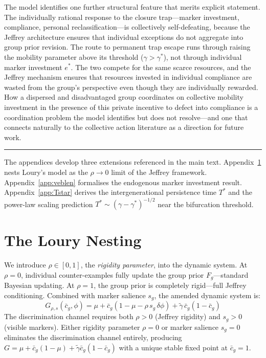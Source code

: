 \documentclass[12pt,a4paper]{article}
\theoremstyle{definition}
\numberwithin{proposition}{subsection}
\begin{document}
The model identifies one further structural feature that merits
explicit statement. The individually rational response to the
closure trap---marker investment, compliance, personal
reclassification---is collectively self-defeating, because the
Jeffrey architecture ensures that individual exceptions do not
aggregate into group prior revision. The route to permanent trap
escape runs through raising the mobility parameter above its
threshold ($\gamma > \gamma^*$), not through individual marker
investment $e^*$. The
two compete for the same scarce resources, and the Jeffrey
mechanism ensures that resources invested in individual compliance
are wasted from the group's perspective even though they are
individually rewarded. How a dispersed and disadvantaged group
coordinates on collective mobility investment in the presence of
this private incentive to defect into compliance is a coordination
problem the model identifies but does not resolve---and one that
connects naturally to the collective action literature as a
direction for future work.

\bigskip
\noindent\rule{\textwidth}{0.4pt}
\medskip

\noindent The appendices develop three extensions referenced in the
main text. Appendix~\ref{app:loury} nests Loury's model as the
$\rho \to 0$ limit of the Jeffrey framework.
Appendix~\ref{app:veblen} formalises the endogenous marker
investment result. Appendix~\ref{app:Tstar} derives the
intergenerational persistence time $T^*$ and the power-law scaling
prediction $T^* \sim (\gamma - \gamma^*)^{-1/2}$ near the
bifurcation threshold.

\appendix

\section{The Loury Nesting}
\label{app:loury}

We introduce $\rho \in [0,1]$, the \emph{rigidity parameter}, into
the dynamic system. At $\rho = 0$, individual counter-examples fully
update the group prior $F_g$---standard Bayesian updating.
At $\rho = 1$, the group prior is completely rigid---full Jeffrey
conditioning. Combined with marker salience $s_g$, the amended
dynamic system is:
\begin{equation}
  G_{\rho,s}(\bar{c}_g, \phi) = \mu + \bar{c}_g(1 - \mu - \rho\, s_g\, \delta \phi)
  + \tilde{\gamma}\,\bar{c}_g(1-\bar{c}_g)
  \label{eq:loury-rho}
\end{equation}
The discrimination channel requires both $\rho > 0$ (Jeffrey
rigidity) and $s_g > 0$ (visible markers). Either rigidity parameter $\rho = 0$ or
marker salience $s_g = 0$ eliminates the discrimination channel entirely, producing
$G = \mu + \bar{c}_g(1-\mu) + \tilde{\gamma}\bar{c}_g(1-\bar{c}_g)$
with a unique stable fixed point at $\bar{c}_g = 1$.
\end{document}
